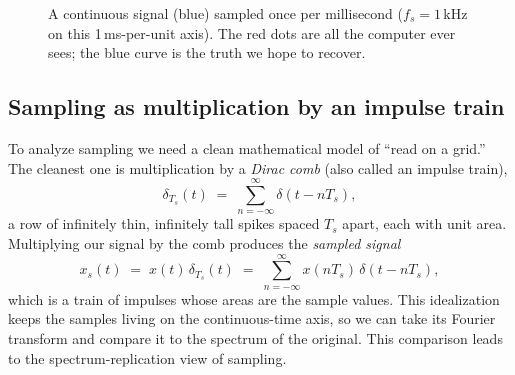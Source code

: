 \begin{figure}[H]
\centering
{}
\caption{A continuous signal (blue) sampled once per millisecond ($f_s=1$\,kHz on this
1\,ms-per-unit axis). The red dots are all the computer ever sees; the blue curve is
the truth we hope to recover.}
\label{ch18:fig-sample-dots}
\end{figure}

\subsection{Sampling as multiplication by an impulse train}
\label{ch18:impulse-train}

To analyze sampling we need a clean mathematical model of ``read on a grid.'' The
cleanest one is multiplication by a \emph{Dirac comb} (also called an impulse train),
\[
  \delta_{T_s}(t) \;=\; \sum_{n=-\infty}^{\infty} \delta(t - nT_s),
\]
a row of infinitely thin, infinitely tall spikes spaced $T_s$ apart, each with unit
area. Multiplying our signal by the comb produces the \emph{sampled signal}
\[
  x_s(t) \;=\; x(t)\,\delta_{T_s}(t)
            \;=\; \sum_{n=-\infty}^{\infty} x(nT_s)\,\delta(t - nT_s),
\]
which is a train of impulses whose areas are the sample values. This idealization
keeps the samples living on the continuous-time axis, so we can take its Fourier
transform and compare it to the spectrum of the original. This comparison
leads to the spectrum-replication view of sampling.

